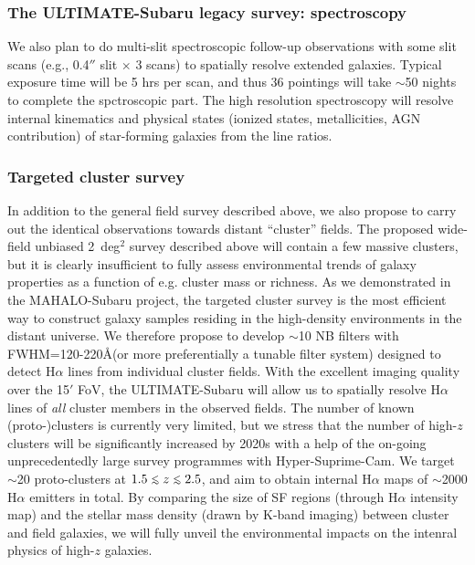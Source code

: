 \subsubsection{The ULTIMATE-Subaru legacy survey: spectroscopy}

We also plan to do multi-slit spectroscopic follow-up observations with
some slit scans (e.g., 0.4$''$ slit $\times$ 3 scans) to spatially
resolve extended galaxies. Typical exposure time will be 5 hrs per scan,
and thus 36 pointings will take $\sim$50 nights to complete the
spctroscopic part. The high resolution spectroscopy will resolve
internal kinematics and physical states (ionized states, metallicities,
AGN contribution) of star-forming galaxies from the line ratios.

\subsubsection{Targeted cluster survey}

In addition to the general field survey described above, we also propose 
to carry out the identical observations towards distant ``cluster'' fields. 
The proposed wide-field unbiased 2~deg$^2$ survey described above will 
contain a few massive clusters, but it is clearly insufficient to fully 
assess environmental trends of galaxy properties as a function of e.g. 
cluster mass or richness. 
As we demonstrated in the MAHALO-Subaru project, the targeted cluster 
survey is the most efficient way to construct galaxy samples residing
in the high-density environments in the distant universe. 
We therefore propose to develop 
$\sim$10 NB filters with FWHM=120-220\AA (or more preferentially a
tunable filter system) designed to detect H$\alpha$ lines from
individual cluster fields. With the excellent  imaging quality over the
15$'$ FoV, the ULTIMATE-Subaru will allow us to spatially resolve
H$\alpha$ lines of {\it all} cluster members in the observed fields. The
number of known (proto-)clusters is currently very limited, but we
stress that the number of high-$z$ clusters will be significantly
increased by 2020s with a help of the on-going unprecedentedly  
large survey programmes with Hyper-Suprime-Cam. We target $\sim$20
proto-clusters at $1.5\lsim z\lsim 2.5$, and aim to obtain internal
H$\alpha$ maps of $\sim$2000 H$\alpha$ emitters in total. By comparing
the size of SF regions (through H$\alpha$ intensity map) and the stellar
mass density (drawn by K-band imaging) between cluster and field
galaxies, we will fully unveil the environmental impacts on the intenral
physics of high-$z$ galaxies. 

